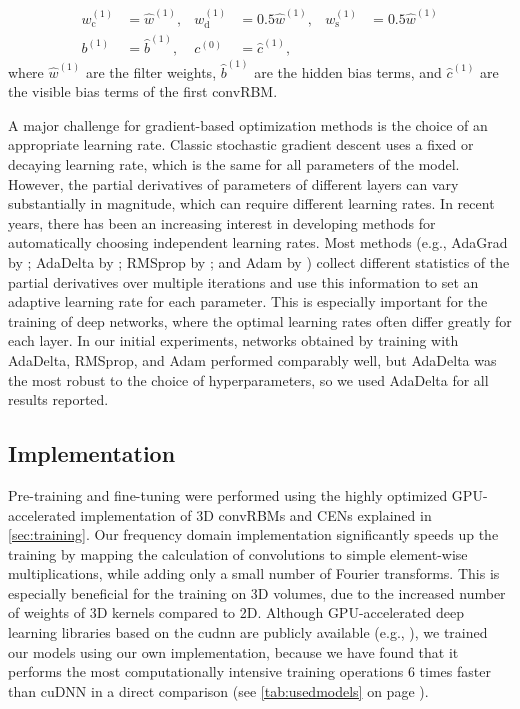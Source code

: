 \begin{align}
w_{\text{c}}^{(1)} &= \hat{w}^{(1)}, &
w_{\text{d}}^{(1)} &= 0.5\hat{w}^{(1)}, &
w_{\text{s}}^{(1)} &= 0.5\hat{w}^{(1)} \\
b^{(1)} &= \hat{b}^{(1)}, &
c^{(0)} &= \hat{c}^{(1)},
\end{align}
where $\hat{w}^{(1)}$ are the filter weights, $\hat{b}^{(1)}$ are the hidden
bias terms, and $\hat{c}^{(1)}$ are the visible bias terms of the first convRBM.

A major challenge for gradient-based optimization methods is the choice of an
appropriate learning rate. Classic stochastic gradient descent \citep{lecun1998}
uses a fixed or decaying learning rate, which is the same for all parameters of
the model. However, the partial derivatives of parameters of different layers
can vary substantially in magnitude, which can require different learning rates.
In recent years, there has been an increasing interest in developing methods for
automatically choosing independent learning rates. Most methods (e.g., AdaGrad
by \citealp{duchi2011adaptive}; AdaDelta by \citealp{zeiler2012adadelta};
RMSprop by \citealp{dauphin2015rmsprop}; and Adam by \citealp{kingma2014adam})
collect different statistics of the partial derivatives over multiple iterations
and use this information to set an adaptive learning rate for each parameter.
This is especially important for the training of deep networks, where the
optimal learning rates often differ greatly for each layer. In our initial
experiments, networks obtained by training with AdaDelta, RMSprop, and Adam
performed comparably well, but AdaDelta was the most robust to the choice of
hyperparameters, so we used AdaDelta for all results reported.

\subsection{Implementation}


Pre-training and fine-tuning were performed using the highly optimized
GPU-accelerated implementation of 3D convRBMs and CENs explained in
\ref{sec:training}. Our frequency domain implementation significantly speeds up
the training by mapping the calculation of convolutions to simple element-wise
multiplications, while adding only a small number of Fourier transforms. This is
especially beneficial for the training on 3D volumes, due to the increased
number of weights of 3D kernels compared to 2D. Although GPU-accelerated deep
learning libraries based on the \gls{cudnn} \citep{chetlur2014} are publicly
available (e.g., \citealp{jia2014,bastien2012,collobert2011torch7}), we trained
our models using our own implementation, because we have found that it performs
the most computationally intensive training operations 6 times faster than cuDNN
in a direct comparison (see \ref{tab:usedmodels} on page
\pageref{tab:usedmodels}).
 
